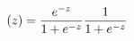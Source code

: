 \documentclass[preview]{standalone}
\begin{document}
\begin{align*}
\special{dvisvgm:raw <g id='unique000'>}(z)=\frac{e^{-z}}{1+e^{-z}}\frac{1}{1+e^{-z}}\special{dvisvgm:raw </g>}
\end{align*}
\end{document}
